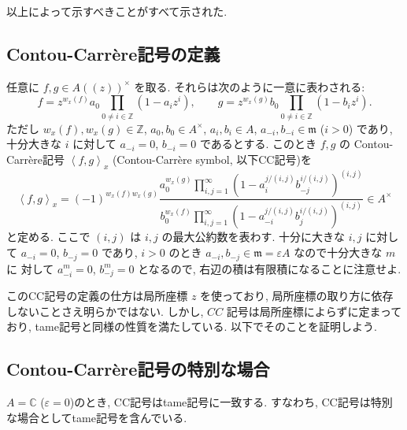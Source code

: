 \documentclass[12pt,twoside]{jarticle}
\newcommand\Z{{\mathbb Z}} %
\newcommand\C{{\mathbb C}} %
\theoremstyle{definition} %
\theoremstyle{definition} %
\theoremstyle{definition} %
\numberwithin{theorem}{section}
\numberwithin{equation}{section}
\numberwithin{figure}{section}
\numberwithin{table}{section}
\newcommand\eps{\varepsilon}
\newcommand\m{{\mathfrak m}}
\newcommand\CC[3]{\left\langle #2,#3\right\rangle_{#1}}
\begin{document}
以上によって示すべきことがすべて示された.


\subsection{Contou-Carr\`ere記号の定義}

任意に $f,g\in A((z))^\times$ を取る.
それらは次のように一意に表わされる:
\[
f = z^{w_x(f)}a_0\prod_{0\ne i\in\Z}(1-a_i z^i), \qquad
g = z^{w_x(g)}b_0\prod_{0\ne i\in\Z}(1-b_i z^i).
\]
ただし $w_x(f),w_x(g)\in\Z$, $a_0,b_0\in A^\times$,
$a_i,b_i\in A$, $a_{-i},b_{-i}\in\m$ ($i>0$) であり,
十分大きな $i$ に対して $a_{-i}=0$, $b_{-i}=0$ であるとする.
このとき $f,g$ の Contou-Carr\`ere記号 $\CC{x}{f}{g}$ 
(Contou-Carr\`ere symbol, 以下CC記号)を
\[
\CC{x}{f}{g} =
(-1)^{w_x(f)w_x(g)}
\frac
{a_0^{w_x(g)}\prod_{i,j=1}^\infty\left(1-a_i^{j/(i,j)}    b_{-j}^{i/(i,j)}\right)^{(i,j)}}
{b_0^{w_x(f)}\prod_{i,j=1}^\infty\left(1-a_{-i}^{j/(i,j)} b_j^{i/(i,j)}   \right)^{(i,j)}}
\in A^\times
\]
と定める. ここで $(i,j)$ は $i,j$ の最大公約数を表わす.
十分に大きな $i,j$ に対して $a_{-i}=0$, $b_{-j}=0$ であり, 
$i>0$ のとき $a_{-i},b_{-j}\in\m=\eps A$ なので十分大きな $m$ に
対して $a_{-i}^m=0$, $b_{-j}^m=0$ となるので, 
右辺の積は有限積になることに注意せよ.

このCC記号の定義の仕方は局所座標 $z$ を使っており, 
局所座標の取り方に依存しないことさえ明らかではない.
しかし, $CC$ 記号は局所座標によらずに定まっており, 
tame記号と同様の性質を満たしている.
以下でそのことを証明しよう.


\subsection{Contou-Carr\`ere記号の特別な場合}

$A=\C$ ($\eps=0$)のとき, CC記号はtame記号に一致する.
すなわち, CC記号は特別な場合としてtame記号を含んでいる.
\end{document}
